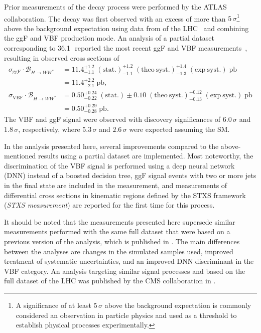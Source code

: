 Prior measurements of the \HWW decay process were performed by the ATLAS collaboration.
The \HWW decay was first observed with an excess of more than $5\,\sigma$\footnote{A significance of at least $5\,\sigma$ above the background expectation is commonly considered an observation in particle physics and used as a threshold to establish physical processes experimentally.} above the background expectation using data from \RunOne of the LHC~\cite{HIGG-2013-13} and combining the ggF and VBF production mode. An analysis of a partial \RunTwo dataset corresponding to 36.1\,\ifb\ reported the most recent ggF and VBF \HWW measurements~\cite{HIGG-2013-13}, resulting in observed cross sections of
\begin{align}
    \label{eq:xsec:prev-run2-results}
    \sigma_{\mathrm{ggF}} \cdot \mathcal{B}_{H \to WW^{\ast}} & = 11.4^{+1.2}_{-1.1}\;(\mathrm{stat.}) ^{+1.2}_{-1.1}\;(\mathrm{theo~ syst.}) ^{+1.4}_{-1.3}\;(\mathrm{exp~ syst.})\;\mathrm{pb}  \\
                                                              & = 11.4 ^{+2.2}_{-2.1}\;\mathrm{pb}, \\
    \sigma_{\mathrm{VBF}} \cdot \mathcal{B}_{H \to WW^{\ast}} & = 0.50 ^{+0.24}_{-0.22}\;(\mathrm{stat.}) \pm 0.10\;(\mathrm{theo~ syst.}) ^{+0.12}_{-0.13}\;(\mathrm{exp~ syst.})\;\mathrm{pb} \\
                                                              & = 0.50 ^{+0.29}_{-0.28}\;\mathrm{pb}.
\end{align}
The VBF and ggF signal were observed with discovery significances of $6.0\,\sigma$ and $1.8\,\sigma$, respectively, where $5.3\,\sigma$ and $2.6\,\sigma$ were expected assuming the SM.

In the analysis presented here, several improvements compared to the above-mentioned results using a partial \RunTwo dataset are implemented. Most noteworthy, the discrimination of the VBF signal is performed using a deep neural network (DNN) instead of a boosted decision tree, ggF signal events with two or more jets in the final state are included in the measurement, and measurements of differential cross sections in kinematic regions defined by the STXS framework (\emph{STXS measurement}) are reported for the first time for this process.

It should be noted that the measurements presented here supersede similar measurements performed with the same full \RunTwo dataset that were based on a previous version of the analysis, which is published in .
The main differences between the analyses are changes in the simulated samples used, improved treatment of systematic uncertainties, and an improved DNN discriminant in the VBF category.
An analysis targeting similar signal processes and based on the full \RunTwo dataset of the LHC was published by the CMS collaboration in .